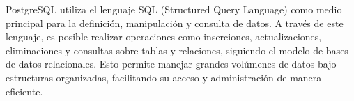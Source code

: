 PostgreSQL utiliza el lenguaje SQL (Structured Query Language) como medio principal para la definición, manipulación y consulta de datos. A través de este lenguaje, es posible realizar operaciones como inserciones, actualizaciones, eliminaciones y consultas sobre tablas y relaciones, siguiendo el modelo de bases de datos relacionales. Esto permite manejar grandes volúmenes de datos bajo estructuras organizadas, facilitando su acceso y administración de manera eficiente.